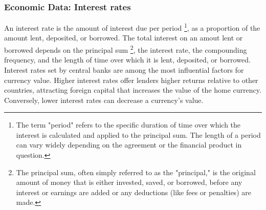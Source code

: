 \documentclass{report}
\begin{document}
     \subsubsection{Economic Data: Interest rates}
     \bigbreak \noindent 
     \begin{concept}
         An interest rate is the amount of interest due per period \footnote{The term "period" refers to the specific duration of time over which the interest is calculated and applied to the principal sum. The length of a period can vary widely depending on the agreement or the financial product in question.}, as a proportion of the amount lent, deposited, or borrowed. The total interest on an amout lent or borrowed depends on the principal sum \footnote{The principal sum, often simply referred to as the "principal," is the original amount of money that is either invested, saved, or borrowed, before any interest or earnings are added or any deductions (like fees or penalties) are made.}, the interest rate, the compounding frequency, and the length of time over which it is lent, deposited, or borrowed.
         \bigbreak \noindent 
         Interest rates set by central banks are among the most influential factors for currency value. Higher interest rates offer lenders higher returns relative to other countries, attracting foreign capital that increases the value of the home currency. Conversely, lower interest rates can decrease a currency's value.
     \end{concept}
     \bigbreak \noindent 

     \bigbreak \noindent 
\end{document}
